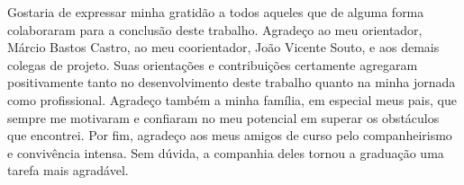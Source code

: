 \begin{agradecimentos}
  Gostaria de expressar minha gratidão a todos aqueles que de alguma forma colaboraram para a conclusão deste trabalho. Agradeço ao meu orientador, Márcio Bastos Castro, ao meu coorientador, João Vicente Souto, e aos demais colegas de projeto. Suas orientações e contribuições certamente agregaram positivamente tanto no desenvolvimento deste trabalho quanto na minha jornada como profissional.
  Agradeço também a minha família, em especial meus pais, que sempre me motivaram e confiaram no meu potencial em superar os obstáculos que encontrei.
  Por fim, agradeço aos meus amigos de curso pelo companheirismo e convivência intensa. Sem dúvida, a companhia deles tornou a graduação uma tarefa mais agradável.
  
\end{agradecimentos}

